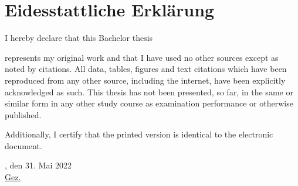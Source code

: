 \chapter*{Eidesstattliche Erklärung}

I hereby declare that this Bachelor thesis 

\begin{quote}
	\textit{\titel}
\end{quote} 

represents my original work and that I have used no other sources except as noted by citations. All data, tables, figures and text citations which have been reproduced from any other source, including the internet, have been explicitly acknowledged as such. This thesis has not been presented, so far, in the same or similar form in any other study course as examination performance or otherwise published.

Additionally, I certify that the printed version is identical to the electronic document.

\vspace{1cm}

\verfassungsort, den 31. Mai 2022 \\[0.5cm]
	{\underline{Gez. \autor}}
	{\makebox[6cm]{\hrulefill}}\\ 
\autorReverse

